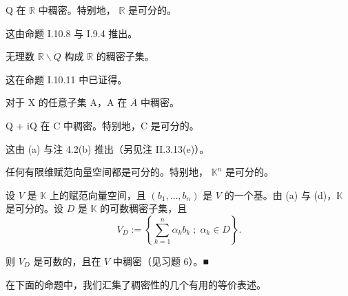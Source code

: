 \begin{example}

\begin{items}
\item

Q 在  $ \mathbb{R} $ 中稠密。特别地， $ \mathbb{R} $ 是可分的。

\proofhead
这由命题 I.10.8 与 I.9.4 推出。
\item

无理数  $ \mathbb{R} \backslash Q $ 构成  $ \mathbb{R} $ 的稠密子集。

\proofhead
这在命题 I.10.11 中已证得。
\item

对于 X 的任意子集 A，A 在  $ \overline{A} $ 中稠密。

\item

Q + iQ 在 C 中稠密。特别地，C 是可分的。

\proofhead
这由 (a) 与注 4.2(b) 推出（另见注 II.3.13(e)）。
\item

任何有限维赋范向量空间都是可分的。特别地， $ \mathbb{K}^{n} $ 是可分的。

\proofhead
设 $V$ 是 $\mathbb{K}$ 上的赋范向量空间，且 $(b_1, \ldots, b_n)$ 是 $V$ 的一个基。由 (a) 与 (d)，$\mathbb{K}$ 是可分的。设 $D$ 是 $\mathbb{K}$ 的可数稠密子集，且
\[
V_{D}:=\left\{\textstyle\sum_{k=1}^{n}\alpha_{k}b_{k}\;;\;\alpha_{k}\in D\right\}.
\]

则 $V_{D}$ 是可数的，且在 $V$ 中稠密（见习题 6）。■

\end{items}

在下面的命题中，我们汇集了稠密性的几个有用的等价表述。

\end{example}

